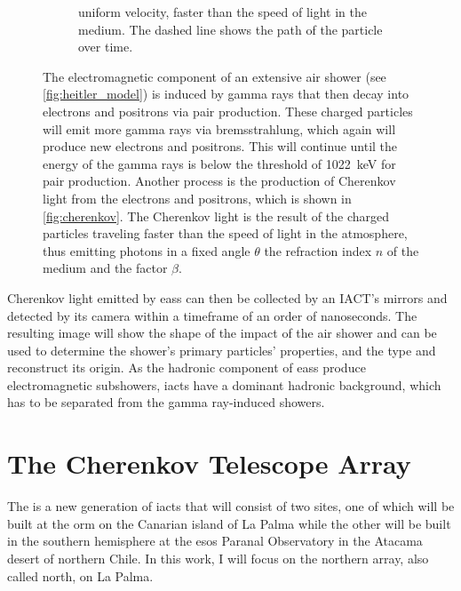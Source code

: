 \begin{figure}
\begin{subfigure}[t]{0.45\textwidth}
{        uniform velocity, faster than the speed of light in the medium. The dashed line shows the
        path of the particle over time.}
        \label{fig:cherenkov}
    \end{subfigure}
    \caption{The electromagnetic component of an extensive air shower (see \autoref{fig:heitler_model})
    is induced by gamma rays that then decay into electrons and positrons via pair production.
    These charged particles will emit more gamma rays via bremsstrahlung, which again will produce
    new electrons and positrons. This will continue until \eg the energy of the gamma rays is below
    the threshold of \SI{1022}{\kilo\eV} for pair production. Another process is the production of
    Cherenkov light from the electrons and positrons, which is shown in \autoref{fig:cherenkov}.
    The Cherenkov light is the result of the charged particles traveling faster than the speed of light
    in the atmosphere, thus emitting photons in a fixed angle \(\theta\) \wrt the refraction index
    \(n\) of the medium and the factor \(\beta\).}
    \label{fig:cherenkov_heitler}
\end{figure}

Cherenkov light emitted by \glspl{eas} can then be collected by an IACT's mirrors and detected by
its camera within a timeframe of an order of nanoseconds. The resulting image will show the shape
of the impact of the air shower and can be used to determine the shower's primary particles' properties,
and the type and reconstruct its origin. As the hadronic component of \glspl{eas} produce
electromagnetic subshowers, \glspl{iact} have a dominant hadronic background, which has to be
separated from the gamma ray-induced showers.


\section{The Cherenkov Telescope Array}

The \cta{} is a new generation of \glspl{iact} that will consist of two sites,
one of which will be built at the \gls{orm} on the Canarian island of La Palma while the other
will be built in the southern hemisphere at the \glspl{eso} Paranal Observatory in the Atacama desert
of northern Chile. In this work, I will focus on the northern array, also called \cta{} north,
on La Palma.

